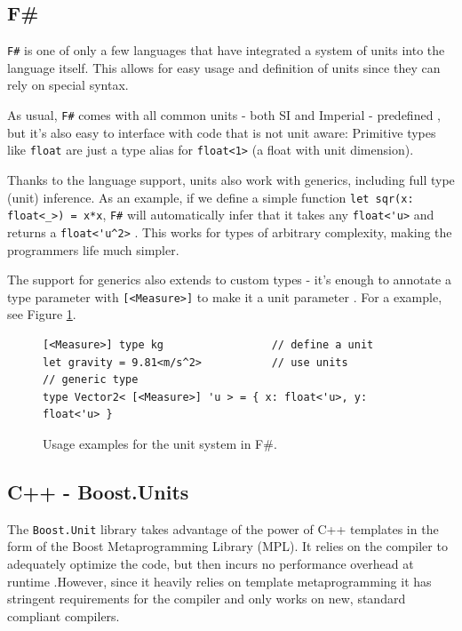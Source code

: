 \documentclass[12pt,oneside,a4paper]{scrbook}
\theoremstyle{definition}
\begin{document}
\subsection{F\#}

\verb/F#/ is one of only a few languages that have integrated a system of units into the language itself. This allows for easy usage and definition of units since they can rely on special syntax.
\citep{Kennedy08:1}

As usual, \verb/F#/ comes with all common units - both SI and Imperial - predefined \citep{Kennedy08:2}, but it's also easy to interface with code that is not unit aware: Primitive types like \verb/float/ are just a type alias for \verb/float<1>/ (a float with unit dimension).

Thanks to the language support, units also work with generics, including full type (unit) inference. As an example, if we define a simple function \verb/let sqr(x: float<_>) = x*x/, \verb/F#/ will automatically infer that it takes any \verb/float<'u>/ and returns a \verb/float<'u^2>/ \citep{Kennedy08:3}. This works for types of arbitrary complexity, making the programmers life much simpler.

The support for generics also extends to custom types - it's enough to annotate a type parameter with \verb/[<Measure>]/ to make it a unit parameter \citep{Kennedy08:4}. For a example, see Figure \ref{code:fsharp}.


\begin{figure}
\begin{verbatim}
[<Measure>] type kg                 // define a unit
let gravity = 9.81<m/s^2>           // use units
// generic type
type Vector2< [<Measure>] 'u > = { x: float<'u>, y: float<'u> }
\end{verbatim}
\caption{Usage examples for the unit system in F\#.}
\label{code:fsharp}
\end{figure}

\subsection{C++ - Boost.Units}

The \verb/Boost.Unit/ library takes advantage of the power of C++ templates in the form of the Boost Metaprogramming Library (MPL).  It relies on the compiler to adequately optimize the code, but then incurs no performance overhead at runtime \citep{Schabel10}.However, since it heavily relies on template metaprogramming it has stringent requirements for the compiler and only works on new, standard compliant compilers.
\end{document}
